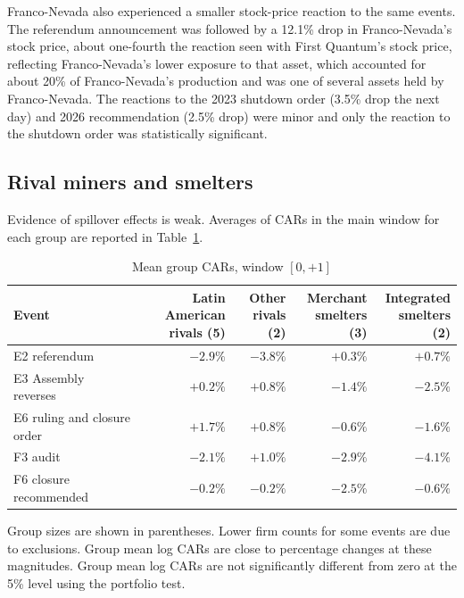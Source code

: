 \documentclass[11pt]{article}
\begin{document}
Franco-Nevada also experienced a smaller stock-price reaction to the same events. The referendum announcement was followed by a 12.1\% drop in Franco-Nevada's stock price, about one-fourth the reaction seen with First Quantum's stock price, reflecting Franco-Nevada's lower exposure to that asset, which accounted for about 20\% of Franco-Nevada's production and was one of several assets held by Franco-Nevada. The reactions to the 2023 shutdown order (3.5\% drop the next day) and 2026 recommendation (2.5\% drop) were minor and only the reaction to the shutdown order was statistically significant.

\subsection{Rival miners and smelters}

Evidence of spillover effects is weak. Averages of CARs in the main window for each group are reported in Table~\ref{tab:groups}.

\begin{table}[h]
\centering
\caption{Mean group CARs, window $[0,+1]$}
\label{tab:groups}
\small
\begin{tabular}{l r r r r}
\toprule
Event & \shortstack{Latin American\\rivals (5)} & \shortstack{Other\\rivals (2)} & \shortstack{Merchant\\smelters (3)} & \shortstack{Integrated\\smelters (2)} \\
\midrule
E2 referendum & $-2.9\%$ & $-3.8\%$ & $+0.3\%$ & $+0.7\%$ \\
E3 Assembly reverses & $+0.2\%$ & $+0.8\%$ & $-1.4\%$ & $-2.5\%$ \\
E6 ruling and closure order & $+1.7\%$ & $+0.8\%$ & $-0.6\%$ & $-1.6\%$ \\
F3 audit & $-2.1\%$ & $+1.0\%$ & $-2.9\%$ & $-4.1\%$ \\
F6 closure recommended & $-0.2\%$ & $-0.2\%$ & $-2.5\%$ & $-0.6\%$ \\
\bottomrule
\end{tabular}

\vspace{0.3em}
\parbox{0.92\textwidth}{\footnotesize Group sizes are shown in parentheses. Lower firm counts for some events are due to exclusions. Group mean log CARs are close to percentage changes at these magnitudes. Group mean log CARs are not significantly different from zero at the 5\% level using the portfolio test.}
\end{table}
\end{document}
